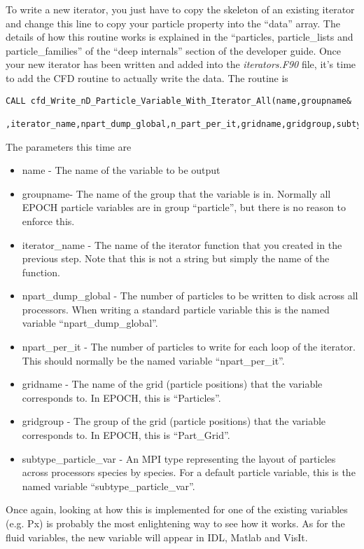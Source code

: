 \documentclass[12pt]{article}
\newcommand{\simpleboxverbatim}{\begin{Verbatim}[obeytabs=true,frame=single,
  framerule=0.5mm,rulecolor=\color{warwickmid}]}
\newcommand{\nEPOCH}{{\color{warwickdark}\fontfamily{phv}\selectfont EPOCH}}
\newcommand{\EPOCH}{{\nEPOCH} }
\begin{document}
To write a new iterator, you just have to copy the skeleton of an existing
iterator and change this line to copy your particle property into the ``data''
array. The details of how this routine works is explained in the ``particles,
particle\_lists and particle\_families'' of the ``deep internals'' section of
the developer guide. Once your new iterator has been written and added into the
{\it iterators.F90} file, it's time to add the CFD routine to actually write
the data. The routine is
\simpleboxverbatim
CALL cfd_Write_nD_Particle_Variable_With_Iterator_All(name,groupname&
            ,iterator_name,npart_dump_global,n_part_per_it,gridname,gridgroup,subtype_particle_var)
\end{Verbatim}

The parameters this time are
\begin{itemize}
\item name - The name of the variable to be output
\item groupname- The name of the group that the variable is in. Normally all
  \EPOCH particle variables are in group ``particle'', but there is no reason
  to enforce this.
\item iterator\_name - The name of the iterator function that you created in
  the previous step. Note that this is not a string but simply the name of the
  function.
\item npart\_dump\_global - The number of particles to be written to disk
  across all processors. When writing a standard particle variable this is the
  named variable ``npart\_dump\_global''.
\item npart\_per\_it - The number of particles to write for each loop of the
  iterator. This should normally be the named variable ``npart\_per\_it''.
\item gridname - The name of the grid (particle positions) that the variable
  corresponds to. In EPOCH, this is ``Particles''.
\item gridgroup - The group of the grid (particle positions) that the variable
  corresponds to. In EPOCH, this is ``Part\_Grid''.
\item subtype\_particle\_var - An MPI type representing the layout of particles
  across processors species by species. For a default particle variable, this
  is the named variable ``subtype\_particle\_var''.
\end{itemize}

Once again, looking at how this is implemented for one of the existing
variables (e.g. Px) is probably the most enlightening way to see how it
works. As for the fluid variables, the new variable will appear in IDL, Matlab
and VisIt.
\end{document}
